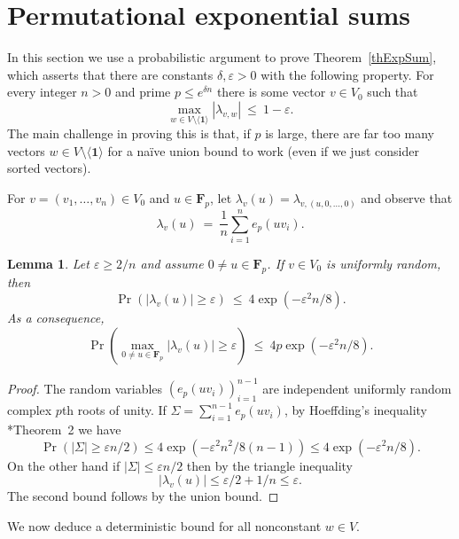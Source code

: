 \documentclass[11pt]{amsart}
\numberwithin{equation}{section}
\newtheorem{lemma}[theorem]{Lemma}
\theoremstyle{remark}
\newcommand{\F}{\mathbf{F}}
\newcommand\br[1]{{\left(#1\right)}}
\newcommand{\gen}[1]{\langle{#1}\rangle}
\newcommand\eps{\varepsilon}
\def\one{\mathbf{1}}
\begin{document}
\vspace{0.1cm}
\section{Permutational exponential sums}

In this section we use a probabilistic argument to prove Theorem~\ref{thExpSum}, which asserts that there are constants $\delta, \eps > 0$ with the following property. For every integer $n > 0$ and prime $p \le e^{\delta n}$ there is some vector $v \in V_0$ such that
\[
    \max_{w \in V \setminus \gen\one} |\lambda_{v, w}|
    \> \le \> 1 - \eps.
\]
The main challenge in proving this is that, if $p$ is large, there are far too many vectors $w \in V \setminus \gen \one$ for a na\"ive union bound to work (even if we just consider sorted vectors).

For $v = (v_1,\ldots,v_n) \in V_0$ and $u \in \F_p$,
let $\lambda_v(u) = \lambda_{v,(u,0,\ldots,0)}$ and observe that
\[
    \lambda_v(u) \> = \> \frac1n \sum_{i=1}^n e_p( u v_i).
\]

\begin{lemma}
    \label{lem:tail-bound}
    Let $\eps \ge 2/n$ and assume $0 \ne u \in \F_p$.
    If $v \in V_0$ is uniformly random, then
    \[
        \Pr(|\lambda_v(u)| \ge \varepsilon) \> \le \>
        4 \exp(-\varepsilon^2 n / 8).
    \]
    As a consequence,
    \[
        \Pr\br{\max_{0 \ne u \in \F_p} |\lambda_v(u)| \ge \varepsilon}
        \> \le \> 4 p \exp\br{-\varepsilon^2 n / 8}.
    \]
\end{lemma}
\begin{proof}
   The random variables $(e_p(u v_i))_{i=1}^{n-1}$ are independent uniformly random complex $p$th roots of unity.
    If \(\Sigma = \sum_{i=1}^{n-1} e_p(uv_i)\),
    by Hoeffding's inequality \cite{Hoe63}*{Theorem~2} we have
    \[
        \Pr\br{|\Sigma| \ge \eps n / 2} \le 4 \exp(-\eps^2 n^2 / 8 (n-1)) \le 4 \exp(-\eps^2 n / 8).
    \]
    On the other hand if $|\Sigma| \le \eps n/2$ then by the triangle inequality
    \[
        |\lambda_v(u)|
        \le \eps/2 + 1/n \le \eps.
    \]
    The second bound follows by the union bound.
\end{proof}


We now deduce a deterministic bound for all nonconstant $w \in V$.
\end{document}
